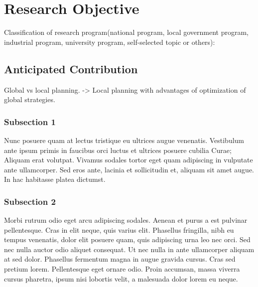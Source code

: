 
\chapter{Research Objective} %

\label{Chapter3} %

Classification of research program(national program, local government program, industrial program, university program, self-selected topic or others):


\section{Anticipated Contribution}

Global vs local planning.
-> Local planning with advantages of optimization of global strategies.

\subsection{Subsection 1}

Nunc posuere quam at lectus tristique eu ultrices augue venenatis. Vestibulum ante ipsum primis in faucibus orci luctus et ultrices posuere cubilia Curae; Aliquam erat volutpat. Vivamus sodales tortor eget quam adipiscing in vulputate ante ullamcorper. Sed eros ante, lacinia et sollicitudin et, aliquam sit amet augue. In hac habitasse platea dictumst.


\subsection{Subsection 2}
Morbi rutrum odio eget arcu adipiscing sodales. Aenean et purus a est pulvinar pellentesque. Cras in elit neque, quis varius elit. Phasellus fringilla, nibh eu tempus venenatis, dolor elit posuere quam, quis adipiscing urna leo nec orci. Sed nec nulla auctor odio aliquet consequat. Ut nec nulla in ante ullamcorper aliquam at sed dolor. Phasellus fermentum magna in augue gravida cursus. Cras sed pretium lorem. Pellentesque eget ornare odio. Proin accumsan, massa viverra cursus pharetra, ipsum nisi lobortis velit, a malesuada dolor lorem eu neque.

